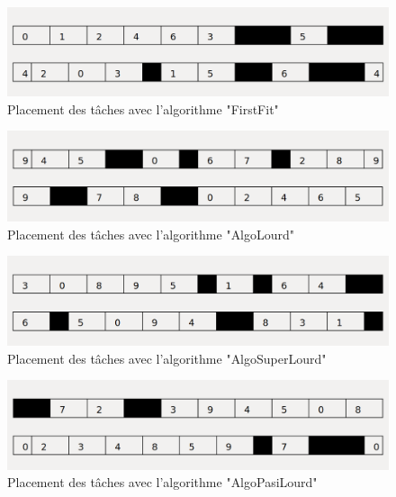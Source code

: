 \documentclass[11pt]{article}
\begin{document}
\begin{figure}[!ht]
    \center
    \includegraphics[scale = 0.35]{FirstFit}    
    \caption{Placement des tâches avec l'algorithme "FirstFit"}
\end{figure} 
\begin{figure}[!ht]
    \center
    \includegraphics[scale = 0.35]{AlgoLourd}
    \caption{Placement des tâches avec l'algorithme "AlgoLourd"}
\end{figure}
\newpage
\begin{figure}[!ht]
    \center
    \includegraphics[scale = 0.35]{AlgoSuperLourd}
    \caption{Placement des tâches avec l'algorithme "AlgoSuperLourd"}
\end{figure}
\begin{figure}[!ht]
    \center
    \includegraphics[scale = 0.35]{AlgoPasiLourd}
    \caption{Placement des tâches avec l'algorithme "AlgoPasiLourd"}
\end{figure}
\end{document}
